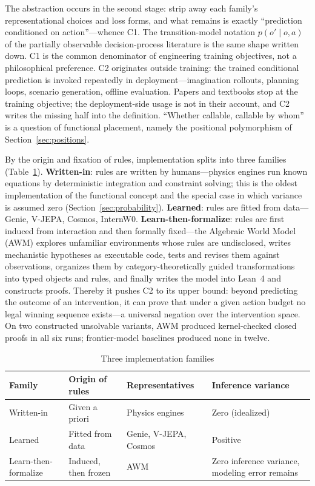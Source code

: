 \documentclass[10pt]{article}
\begin{document}
The abstraction occurs in the second stage: strip away each family's representational choices and loss forms, and what remains is exactly ``prediction conditioned on action''---whence C1. The transition-model notation $p(o'\mid o,a)$ of the partially observable decision-process literature\cite{kaelbling1998pomdp,sutton2018rl} is the same shape written down. C1 is the common denominator of engineering training objectives, not a philosophical preference. C2 originates outside training: the trained conditional prediction is invoked repeatedly in deployment---imagination rollouts, planning loops, scenario generation, offline evaluation. Papers and textbooks stop at the training objective; the deployment-side usage is not in their account, and C2 writes the missing half into the definition. ``Whether callable, callable by whom'' is a question of functional placement, namely the positional polymorphism of Section~\ref{sec:positions}.

By the origin and fixation of rules, implementation splits into three families (Table~\ref{tab:impl}). \textbf{Written-in}: rules are written by humans---physics engines run known equations by deterministic integration and constraint solving; this is the oldest implementation of the functional concept and the special case in which variance is assumed zero (Section~\ref{sec:probability}). \textbf{Learned}: rules are fitted from data---Genie, V-JEPA, Cosmos, InternW0\cite{internw0}. \textbf{Learn-then-formalize}: rules are first induced from interaction and then formally fixed---the Algebraic World Model (AWM) explores unfamiliar environments whose rules are undisclosed, writes mechanistic hypotheses as executable code, tests and revises them against observations, organizes them by category-theoretically guided transformations into typed objects and rules, and finally writes the model into Lean~4 and constructs proofs\cite{awm2026}. Thereby it pushes C2 to its upper bound: beyond predicting the outcome of an intervention, it can prove that under a given action budget no legal winning sequence exists---a universal negation over the intervention space. On two constructed unsolvable variants, AWM produced kernel-checked closed proofs in all six runs; frontier-model baselines produced none in twelve\cite{awm2026}.

\begin{table}[htbp]
\centering\small
\caption{Three implementation families}
\label{tab:impl}
\begin{tabularx}{\textwidth}{llll}
\toprule
Family & Origin of rules & Representatives & Inference variance \\
\midrule
Written-in & Given a priori & Physics engines & Zero (idealized) \\
Learned & Fitted from data & Genie, V-JEPA, Cosmos & Positive \\
Learn-then-formalize & Induced, then frozen & AWM\cite{awm2026} & Zero inference variance, modeling error remains \\
\bottomrule
\end{tabularx}
\end{table}
\end{document}
